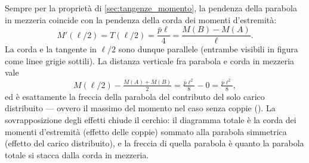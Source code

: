 \begin{esempio}
\begin{svolgimento}
		Sempre per la proprietà di
		\ref{sec:tangenze_momento}, la pendenza della
		parabola in mezzeria coincide con la pendenza
		della corda dei momenti d'estremità:
		\[
		M'(\ell/2) = T(\ell/2) = \frac{\bar p\ell}{4}
		= \frac{M(B) - M(A)}{\ell}.
		\]
		La corda e la tangente in $\ell/2$ sono dunque
		parallele (entrambe visibili in figura come linee
		grigie sottili). La distanza verticale fra parabola
		e corda in mezzeria vale
		\[
		M(\ell/2) - \tfrac{M(A)+M(B)}{2}
		= \tfrac{\bar p\ell^2}{8} - 0
		= \tfrac{\bar p\ell^2}{8},
		\]
		ed è esattamente la freccia della parabola del
		contributo del solo carico distribuito --- ovvero
		il massimo del momento nel caso senza coppie
		(). La sovrapposizione
		degli effetti chiude il cerchio: il diagramma totale
		è la corda dei momenti d'estremità (effetto delle
		coppie) sommato alla parabola simmetrica (effetto
		del carico distribuito), e la freccia di quella
		parabola è quanto la parabola totale si stacca dalla
		corda in mezzeria.
		
	\end{svolgimento}
\end{esempio}


